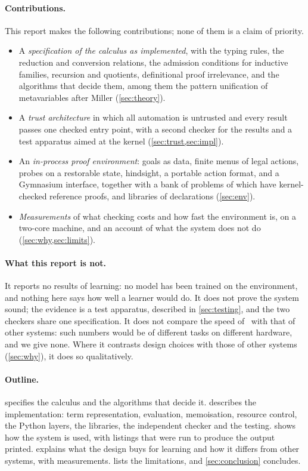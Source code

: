\paragraph{Contributions.}
This report makes the following contributions; none of them is a claim of priority.
\begin{itemize}
\item A \emph{specification of the calculus as implemented}, with the typing rules, the reduction and conversion relations, the admission conditions for inductive families, recursion and quotients, definitional proof irrelevance, and the algorithms that decide them, among them the pattern unification of metavariables after Miller \citep{miller91} (\cref{sec:theory}).
\item A \emph{trust architecture} in which all automation is untrusted and every result passes one checked entry point, with a second checker for the results and a test apparatus aimed at the kernel (\cref{sec:trust,sec:impl}).
\item An \emph{in-process proof environment}: goals as data, finite menus of legal actions, probes on a restorable state, hindsight, a portable action format, and a Gymnasium interface, together with a bank of \bankProblems{} problems of which \proofsProved{} have kernel-checked reference proofs, and libraries of \libGlobals{} declarations (\cref{sec:env}).
\item \emph{Measurements} of what checking costs and how fast the environment is, on a two-core machine, and an account of what the system does not do (\cref{sec:why,sec:limits}).
\end{itemize}

\paragraph{What this report is not.}
It reports no results of learning: no model has been trained on the environment, and nothing here says how well a learner would do.
It does not prove the system sound; the evidence is a test apparatus, described in \cref{sec:testing}, and the two checkers share one specification.
It does not compare the speed of \ITP\ with that of other systems: such numbers would be of different tasks on different hardware, and we give none.
Where it contrasts design choices with those of other systems (\cref{sec:why}), it does so qualitatively.

\paragraph{Outline.}
 specifies the calculus and the algorithms that decide it.
 describes the implementation: term representation, evaluation, memoisation, resource control, the Python layers, the libraries, the independent checker and the testing.
 shows how the system is used, with listings that were run to produce the output printed.
 explains what the design buys for learning and how it differs from other systems, with measurements.
 lists the limitations, and \cref{sec:conclusion} concludes.
